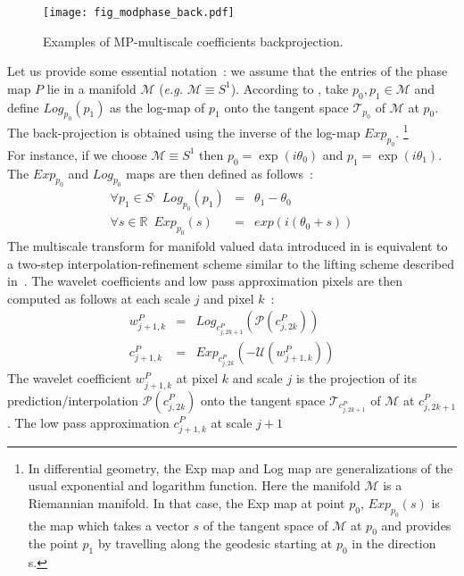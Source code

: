 \begin{figure*}[htb]
\centerline{
 \vbox{
 \texttt{[image: fig\_modphase\_back.pdf]}
 }
 }
\caption{Examples of MP-multiscale coefficients backprojection.}
\label{fig_modphase_back}
\end{figure*}
Let us provide some essential notation~: we assume that the entries of the phase map $P$ lie in a manifold $\mathcal{M}$ 
(\textit{e.g.} $\mathcal{M}\equiv S^1$). According to \cite{rahman05}, take $p_0,p_1 \in \mathcal{M}$ and define $Log_{p_0}(p_1)$ 
as the log-map of $p_1$ onto the tangent space $\mathcal{T}_{p_0}$ of $\mathcal{M}$ at $p_0$. The back-projection is obtained 
using the inverse of the log-map $Exp_{p_0}$. \footnote{In differential geometry, the Exp map and Log map are generalizations of 
the usual exponential and logarithm function. Here the manifold $\mathcal{M}$ is a Riemannian manifold. In that case, the Exp map 
at point $p_0$, $Exp_{p_0}(s)$ is the map which takes a vector $s$ of the tangent space of $\mathcal{M}$ at $p_0$ and provides the 
point $p_1$ by travelling along the geodesic starting at $p_0$ in the direction s.}\\
For instance, if we choose $\mathcal{M} \equiv S^1$ then $p_0 = \exp(i \theta_0)$ and $p_1 = \exp(i \theta_1)$. The $Exp_{p_0}$ and 
$Log_{p_0}$ maps are then defined as follows~:
\begin{eqnarray}
\forall p_1 \in S^, \,\,\,  Log_{p_0} (p_1) & = & \theta_1 - \theta_0 \\
\forall s \in \mathbb{R} \,\,\, Exp_{p_0} (s) & = & exp(i(\theta_0 + s))
\end{eqnarray}
The multiscale transform for manifold valued data introduced in \cite{rahman05} is equivalent to a two-step interpolation-refinement 
scheme similar to the lifting scheme described in~\cite{wave:sweldens98}. The wavelet coefficients and low pass approximation pixels 
are then computed as follows at each scale $j$ and pixel $k$~:
\begin{eqnarray}\label{eq:mani}
w_{j+1,k}^P & = & Log_{c_{j,2k+1}^P}\left(\mathcal{P}(c_{j,2k}^P)\right)   \\
c_{j+1,k}^P & = & Exp_{c_{j,2k}^P} ( -\mathcal{U}(w_{j+1,k}^P))
\label{eq:mani2}
\end{eqnarray}
The wavelet coefficient $w_{j+1,k}^P$ at pixel $k$ and scale $j$ is the projection of its prediction/interpolation $\mathcal{P}(c_{j,2k}^P)$ 
onto the tangent space $\mathcal{T}_{c_{j,2k+1}^P}$ of $\mathcal{M}$ at $c_{j,2k+1}^P$. The low pass approximation $c_{j+1,k}^P$ at scale $j+1$ 
